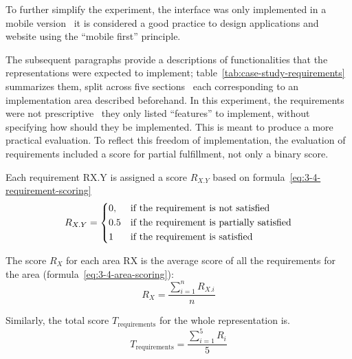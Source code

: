 To further simplify the experiment, the interface was only implemented in a mobile version \textendash\ it is considered a good practice to design applications and website using the \enquote{mobile first} principle.

The subsequent paragraphs provide a descriptions of functionalities that the representations were expected to implement;
table~\ref{tab:case-study-requirements} summarizes them, split across five sections \textendash\ each corresponding to an implementation area described beforehand.
In this experiment, the requirements were not prescriptive \textendash\ they only listed \enquote{features} to implement, without specifying how should they be implemented.
This is meant to produce a more practical evaluation.
To reflect this freedom of implementation, the evaluation of requirements included a score for partial fulfillment, not only a binary score.

Each requirement RX.Y is assigned a score $R_{X.Y}$ based on formula~\ref{eq:3-4-requirement-scoring}
\begin{equation}
    R_{X.Y} =
    \begin{dcases}
        0,  & \text{if the requirement is not satisfied}\\
        0.5 & \text{if the requirement is partially satisfied}\\
        1   & \text{if the requirement is satisfied}
    \end{dcases}
    \label{eq:3-4-requirement-scoring}
\end{equation}

The score $R_X$ for each area RX is the average score of all the requirements for the area (formula~\ref{eq:3-4-area-scoring}):
\begin{equation}
    R_X = \frac{\sum_{i=1}^{n} R_{X.i}}{n}
    \label{eq:3-4-area-scoring}
\end{equation}

Similarly, the total score $T_{\text{requirements}}$ for the whole representation is\textellipsis.
\begin{equation}
    T_{\text{requirements}} = \frac{\sum_{i=1}^{5} R_i}{5}
    \label{eq:3-4-representation-scoring}
\end{equation}

